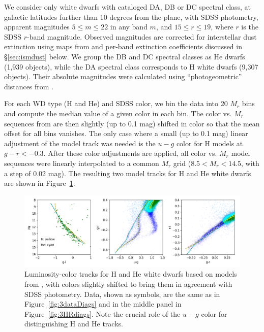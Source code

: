 We consider only white dwarfs with cataloged DA, DB or DC spectral class, at galactic latitudes further than 10 degrees from the plane,
with SDSS photometry, apparent magnitudes $5 \le m \le 22$ in any band $m$, and $15 \le r \le 19$, where $r$ is the SDSS $r$-band magnitude.
Observed magnitudes are corrected for interstellar dust extinction using maps from \cite{schlegel_maps_1998} and per-band extinction coefficients
discussed in \S\ref{sec:ismdust} below. We group the DB and DC spectral classes as He dwarfs (1,939 objects), while the DA spectral class corresponds
to H white dwarfs (9,307 objects). Their absolute magnitudes were calculated using ``photogeometric'' distances from \cite{bailer-jones_estimating_2021}. 

For each WD type (H and He) and SDSS color, we bin the data into 20 $M_r$ bins and compute the median value of a given color in each bin.
The color vs. $M_r$ sequences from \cite{1995PASP..107.1047B} are then slightly (up to 0.1 mag) shifted in color so that the mean offset for all bins
vanishes. The only case where a small (up to 0.1 mag) linear adjustment of the model track was needed is the $u-g$ color for H models at $g-r<-0.3$. 
After these color adjustments are applied, all color vs. $M_r$ model sequences were linearly interpolated to a common $M_r$ grid ($8.5 < M_r < 14.5$,
with a step of 0.02 mag). The resulting two model tracks for H and He white dwarfs are shown in Figure~\ref{fig:locusWDs}. 
   

\begin{figure}[ht!] 
\includegraphics[width=1.0\textwidth,angle=0]{figures/plot3diagsBAzoom.png}
\caption{Luminosity-color tracks for H and He white dwarfs based on models from \cite{1995PASP..107.1047B}, with
  colors slightly shifted to bring them in agreement with SDSS photometry. Data, shown as symbols, are the same as in
  Figure~\ref{fig:3dataDiags} and in the middle panel in Figure~\ref{fig:3HRdiags}. Note the crucial role of the $u-g$ color
  for distinguishing H and He tracks.}
\label{fig:locusWDs}
\end{figure}



